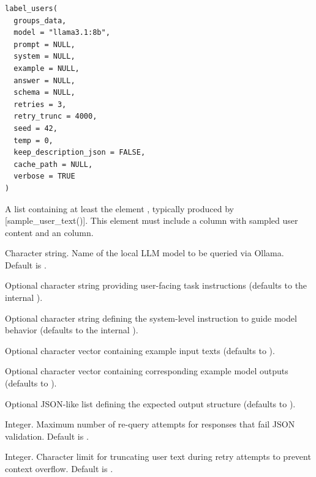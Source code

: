 \documentclass[a4paper]{book}
\begin{document}
%
\begin{Usage}
\begin{verbatim}
label_users(
  groups_data,
  model = "llama3.1:8b",
  prompt = NULL,
  system = NULL,
  example = NULL,
  answer = NULL,
  schema = NULL,
  retries = 3,
  retry_trunc = 4000,
  seed = 42,
  temp = 0,
  keep_description_json = FALSE,
  cache_path = NULL,
  verbose = TRUE
)
\end{verbatim}
\end{Usage}
%
\begin{Arguments}
\begin{ldescription}
\item[\code{groups\_data}] A list containing at least the element , 
typically produced by [sample\_user\_text()]. This element must include a column  
with sampled user content and an  column.

\item[\code{model}] Character string. Name of the local LLM model to be queried via Ollama. 
Default is .

\item[\code{prompt}] Optional character string providing user-facing task instructions 
(defaults to the internal ).

\item[\code{system}] Optional character string defining the system-level instruction to guide model behavior 
(defaults to the internal ).

\item[\code{example}] Optional character vector containing example input texts 
(defaults to ).

\item[\code{answer}] Optional character vector containing corresponding example model outputs 
(defaults to ).

\item[\code{schema}] Optional JSON-like list defining the expected output structure 
(defaults to ).

\item[\code{retries}] Integer. Maximum number of re-query attempts for responses that fail JSON validation. 
Default is .

\item[\code{retry\_trunc}] Integer. Character limit for truncating user text during retry attempts to prevent 
context overflow. Default is .


\end{ldescription}
\end{Arguments}
\end{document}
